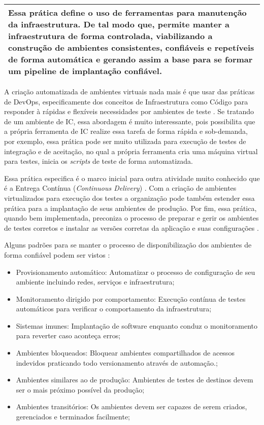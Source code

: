 \begin{table}[H]
\centering
\begin{tabular}{|p{130mm}|}
\hline
Essa prática define o uso de ferramentas para manutenção da infraestrutura. De tal modo que, permite manter a infraestrutura de forma controlada, viabilizando a construção de ambientes consistentes, confiáveis e repetíveis de forma automática e gerando assim a base para se formar um pipeline de implantação confiável.\\ 
\hline
\end{tabular}
\end{table}

A criação automatizada de ambientes virtuais nada mais é que usar das práticas de DevOps, especificamente dos conceitos de Infraestrutura como Código para responder à rápidas e flexíveis necessidades por ambientes de teste \cite{BRAGA2015}. Se tratando de um ambiente de IC, essa abordagem é muito interessante, pois possibilita que a própria ferramenta de IC realize essa tarefa de forma rápida e sob-demanda, por exemplo, essa prática pode ser muito utilizada para execução de testes de integração e de aceitação, no qual a própria ferramenta cria uma máquina virtual para testes, inicia os \textit{scripts} de teste de forma automatizada.

Essa prática especifica é o marco inicial para outra atividade muito conhecido que é a Entrega Contínua (\textit{Continuous Delivery}) \cite{WOOTTON2013}. Com a criação de ambientes virtualizados para execução dos testes a organização pode também estender essa prática para a implantação de seus ambientes de produção. Por fim, essa prática, quando bem implementada, preconiza o processo de preparar e gerir os ambientes de testes corretos e instalar as versões corretas da aplicação e suas configurações \cite{humble2010}.

Alguns padrões para se manter o processo de disponibilização dos ambientes de forma confiável podem ser vistos \cite{duvall2011}:

\begin{itemize}
    \item Provisionamento automático: Automatizar o processo de configuração de seu ambiente incluindo redes, serviços e infraestrutura;
    \item Monitoramento dirigido por comportamento: Execução contínua de testes automáticos para verificar o comportamento da infraestrutura;
    \item Sistemas imunes: Implantação de software enquanto conduz o monitoramento para reverter caso aconteça erros;
    \item Ambientes bloqueados: Bloquear ambientes compartilhados de acessos indevidos praticando todo versionamento através de automação.;
    \item Ambientes similares ao de produção: Ambientes de testes de destinos devem ser o mais próximo possível da produção;
    \item Ambientes transitórios: Os ambientes devem ser capazes de serem criados, gerenciados e terminados facilmente;
\end{itemize}


